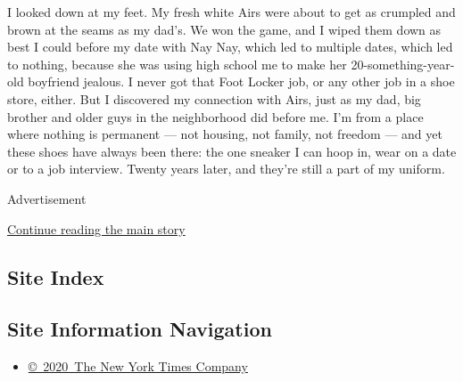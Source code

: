 I looked down at my feet. My fresh white Airs were about to get as
crumpled and brown at the seams as my dad's. We won the game, and I
wiped them down as best I could before my date with Nay Nay, which led
to multiple dates, which led to nothing, because she was using high
school me to make her 20-something-year-old boyfriend jealous. I never
got that Foot Locker job, or any other job in a shoe store, either. But
I discovered my connection with Airs, just as my dad, big brother and
older guys in the neighborhood did before me. I'm from a place where
nothing is permanent --- not housing, not family, not freedom --- and
yet these shoes have always been there: the one sneaker I can hoop in,
wear on a date or to a job interview. Twenty years later, and they're
still a part of my uniform.

Advertisement

\protect\hyperlink{after-bottom}{Continue reading the main story}

\hypertarget{site-index}{%
\subsection{Site Index}\label{site-index}}

\hypertarget{site-information-navigation}{%
\subsection{Site Information
Navigation}\label{site-information-navigation}}

\begin{itemize}
\tightlist
\item
  \href{https://help.nytimes3xbfgragh.onion/hc/en-us/articles/115014792127-Copyright-notice}{©~2020~The
  New York Times Company}
\end{itemize}

